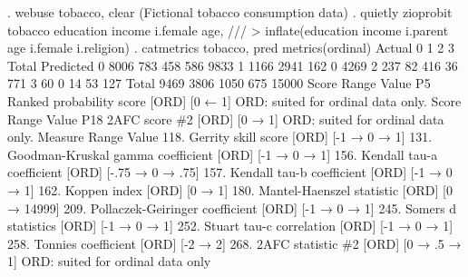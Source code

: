 . webuse tobacco, clear
(Fictional tobacco consumption data)
{\smallskip}
. quietly zioprobit tobacco education income i.female age,  ///
> inflate(education income i.parent age i.female i.religion)
{\smallskip}
. catmetrics tobacco, pred metrics(ordinal)
{\smallskip}
{}
{\smallskip}
    Actual {\VBAR}      0      1      2      3 {\VBAR}    Total 
 Predicted {\VBAR}                             {\VBAR}
         0 {\VBAR}   8006    783    458    586 {\VBAR}     9833 
         1 {\VBAR}   1166   2941    162      0 {\VBAR}     4269 
         2 {\VBAR}    237     82    416     36 {\VBAR}      771 
         3 {\VBAR}     60      0     14     53 {\VBAR}      127 
     Total {\VBAR}   9469   3806   1050    675 {\VBAR}    15000 
{\smallskip}
{}
Score                                 Range           Value
P5 Ranked probability score [ORD]    [0 ← 1]    {}
ORD: suited for ordinal data only.
{\smallskip}
{}
Score                       Range        Value
P18 2AFC score \#2 [ORD]    [0 → 1]     {}
ORD: suited for ordinal data only.
{\smallskip}
{}
Measure                                                   Range       Value
118. Gerrity skill score [ORD]                     [-1 → 0 → 1]  {}
131. Goodman-Kruskal gamma coefficient [ORD]       [-1 → 0 → 1]  {}
156. Kendall tau-a coefficient [ORD]           [-.75 → 0 → .75]  {}
157. Kendall tau-b coefficient [ORD]               [-1 → 0 → 1]  {}
162. Koppen index [ORD]                                 [0 → 1]  {}
180. Mantel-Haenszel statistic [ORD]                [0 → 14999]  {}
209. Pollaczek-Geiringer coefficient [ORD]         [-1 → 0 → 1]  {}
245. Somers d statistics [ORD]                     [-1 → 0 → 1]  {}
252. Stuart tau-c correlation [ORD]                [-1 → 0 → 1]  {}
258. Tonnies coefficient [ORD]                         [-2 → 2]  {}
268. 2AFC statistic \#2 [ORD]                       [0 → .5 → 1]  {}
ORD: suited for ordinal data only
{\smallskip}
{}
